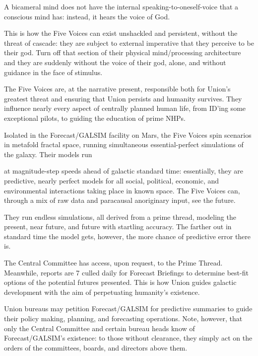 A bicameral mind does not have the internal speaking-to-oneself-voice that a conscious mind  
has: instead, it hears the voice of God. 
 

This is how the Five Voices can exist unshackled and persistent, without the threat of cascade:  
they are subject to external imperative that they perceive to be their god. Turn off that section of  
their physical mind/processing architecture and they are suddenly without the voice of their god,  
alone, and without guidance in the face of stimulus. 
 

The Five Voices are, at the narrative present, responsible both for Union’s greatest threat and   
ensuring that Union persists and humanity survives. They influence nearly every aspect of  
centrally planned human life, from ID’ing some exceptional pilots, to guiding the education of  
prime NHPs. 
 

Isolated in the Forecast/GALSIM facility on Mars, the Five Voices spin scenarios in metafold  
fractal space, running simultaneous essential-perfect simulations of the galaxy. Their models run  

                                                                                                          


at magnitude-step speeds ahead of galactic standard time: essentially, they are predictive, nearly  
perfect models for all social, political, economic, and environmental interactions taking place in  
known space. The Five Voices can, through a mix of raw data and paracausal anoriginary input,  
see the future. 
 

They run endless simulations, all derived from a prime thread, modeling the present, near future,  
and future with startling accuracy. The farther out in standard time the model gets, however, the  
more chance of predictive error there is.
 

The Central Committee has access, upon request, to the Prime Thread. Meanwhile, reports are  
                                                                                                       7 
culled daily for Forecast Briefings to determine best-fit options of the potential futures   
presented. This is how Union guides galactic development with the aim of perpetuating  
humanity’s existence.
 

Union bureaus may petition Forecast/GALSIM  for predictive summaries to guide their policy  
making, planning, and forecasting operations. Note, however, that only the Central Committee  
and certain bureau heads know of Forecast/GALSIM’s existence: to those without clearance,  
they simply act on the orders of the committees, boards, and directors above them.  
 
